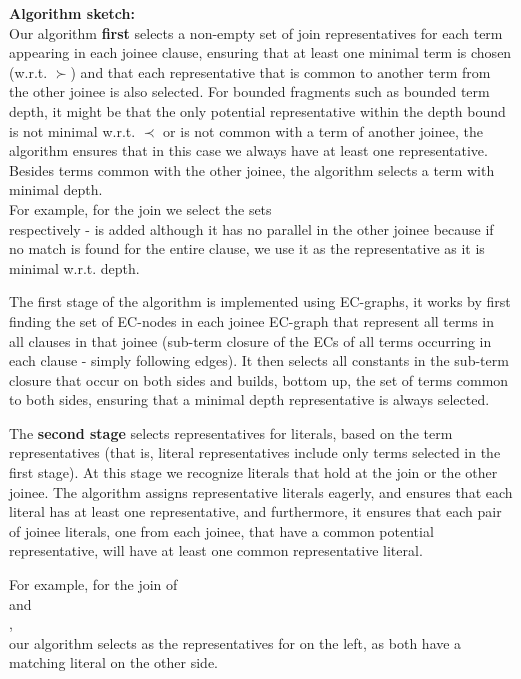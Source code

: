 \noindent
\textbf{Algorithm sketch:} \\
Our algorithm \textbf{first} selects a non-empty set of join representatives for each term appearing in each joinee clause,
ensuring that at least one minimal term is chosen (w.r.t. $\succ$) and that each representative that is common to another term from the other joinee is also selected. 
For bounded fragments such as bounded term depth, it might be that the only potential representative within the depth bound is not minimal w.r.t. $\prec$ or is not common with a term of another joinee, the algorithm ensures that in this case we always have at least one representative. Besides terms common with the other joinee, the algorithm selects a term with minimal depth.\\
For example, for the join  
we select the sets\\  respectively -  is added although it has no parallel in the other joinee because if no match is found for the entire clause, we use it as the representative as it is minimal w.r.t. depth.

The first stage of the algorithm is implemented using EC-graphs, it works by first finding the set of EC-nodes in each joinee EC-graph that represent all terms in all clauses in that joinee (sub-term closure of the ECs of all terms occurring in each clause - simply following \GFA{} edges). It then selects all constants in the sub-term closure that occur on both sides and builds, bottom up, the set of terms common to both sides, ensuring that a minimal depth representative is always selected.


The \textbf{second stage} selects representatives for literals, based on the term representatives (that is, literal representatives include only terms selected in the first stage). At this stage we recognize literals that hold at the join or the other joinee. 
The algorithm assigns representative literals eagerly, and ensures that each literal has at least one representative, 
and furthermore, it ensures that each pair of joinee literals, one from each joinee, that have a common potential representative,
will have at least one common representative literal.

For example, for the join of \\
 and \\
,\\
our algorithm selects  as the representatives for  on the left, as both have a matching literal on the other side.

